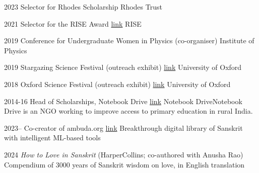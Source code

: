 \documentclass{scrartcl}
\begin{document}

\begin{entrylist}

\splitentry
{2023}
{Selector for Rhodes Scholarship}
{Rhodes Trust}{}

\splitentry
{2021}
{Selector for the RISE Award \href{https://www.risefortheworld.org/}{link}}
{RISE}{}

\splitentry
{2019}
{Conference for Undergraduate Women in Physics (co-organiser)}
{Institute of Physics}{}

\splitentry
{2019}
{Stargazing Science Festival (outreach exhibit) \href{https://web.archive.org/web/20230402133900/https://www.physics.ox.ac.uk/news/stargazing-oxfordhome}{link}}
{University of Oxford}{}

\splitentry
{2018}
{Oxford Science Festival (outreach exhibit) \href{https://web.archive.org/web/20230208050049/https://scienceoxford.com/events/oxfordshire-science-festival/}{link}}
{University of Oxford}{}

\splitentry
{2014-16}
{Head of Scholarships, Notebook Drive \href{https://web.archive.org/web/20230126231829/https://iisc.ac.in/outreach/activities/notebook-drive/}{link}}
{Notebook Drive}{Notebook Drive is an NGO working to improve access to primary education in rural India.}

\end{entrylist}


\begin{entrylist}

\splitentry
{2023–}
{Co-creator of ambuda.org \href{https://www.ambuda.org}{link}}
{}{Breakthrough digital library of Sanskrit with intelligent ML-based tools}

\splitentry
{2024}
{\emph{How to Love in Sanskrit} (HarperCollins; co-authored with Anusha Rao)}
{}{Compendium of 3000 years of Sanskrit wisdom on love, in English translation}

\end{entrylist}




\vfill
\end{document}
